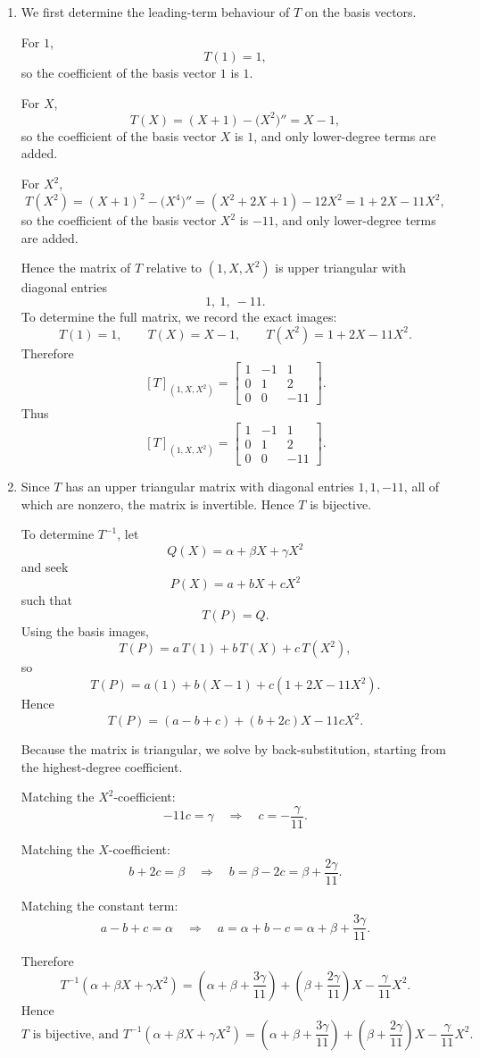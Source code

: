 \documentclass[12pt]{article}
\begin{document}
\begin{enumerate}[label=(\alph*)]
\item We first determine the leading-term behaviour of \(T\) on the basis vectors.

For \(1\),
\[
T(1)=1,
\]
so the coefficient of the basis vector \(1\) is \(1\).

For \(X\),
\[
T(X)=(X+1)-\bigl(X^2\bigr)''=X-1,
\]
so the coefficient of the basis vector \(X\) is \(1\), and only lower-degree terms are added.

For \(X^2\),
\[
T(X^2)=(X+1)^2-\bigl(X^4\bigr)''
=(X^2+2X+1)-12X^2
=1+2X-11X^2,
\]
so the coefficient of the basis vector \(X^2\) is \(-11\), and only lower-degree terms are added.

Hence the matrix of \(T\) relative to \((1,X,X^2)\) is upper triangular with diagonal entries
\[
1,\ 1,\ -11.
\]
To determine the full matrix, we record the exact images:
\[
T(1)=1,\qquad
T(X)=X-1,\qquad
T(X^2)=1+2X-11X^2.
\]
Therefore
\[
[T]_{(1,X,X^2)}
=
\begin{bmatrix}
1 & -1 & 1\\
0 & 1 & 2\\
0 & 0 & -11
\end{bmatrix}.
\]
Thus
\[
\boxed{
[T]_{(1,X,X^2)}
=
\begin{bmatrix}
1 & -1 & 1\\
0 & 1 & 2\\
0 & 0 & -11
\end{bmatrix}.}
\]
\newpage
\item Since \(T\) has an upper triangular matrix with diagonal entries \(1,1,-11\), all of which are nonzero, the matrix is invertible. Hence \(T\) is bijective.

To determine \(T^{-1}\), let
\[
Q(X)=\alpha+\beta X+\gamma X^2
\]
and seek
\[
P(X)=a+bX+cX^2
\]
such that
\[
T(P)=Q.
\]
Using the basis images,
\[
T(P)=a\,T(1)+b\,T(X)+c\,T(X^2),
\]
so
\[
T(P)=a(1)+b(X-1)+c(1+2X-11X^2).
\]
Hence
\[
T(P)=(a-b+c)+(b+2c)X-11cX^2.
\]

Because the matrix is triangular, we solve by back-substitution, starting from the highest-degree coefficient.

Matching the \(X^2\)-coefficient:
\[
-11c=\gamma
\quad\Longrightarrow\quad
c=-\frac{\gamma}{11}.
\]

Matching the \(X\)-coefficient:
\[
b+2c=\beta
\quad\Longrightarrow\quad
b=\beta-2c=\beta+\frac{2\gamma}{11}.
\]

Matching the constant term:
\[
a-b+c=\alpha
\quad\Longrightarrow\quad
a=\alpha+b-c=\alpha+\beta+\frac{3\gamma}{11}.
\]

Therefore
\[
T^{-1}(\alpha+\beta X+\gamma X^2)
=
\left(\alpha+\beta+\frac{3\gamma}{11}\right)
+
\left(\beta+\frac{2\gamma}{11}\right)X
-
\frac{\gamma}{11}X^2.
\]
Hence
\[
\boxed{
T \text{ is bijective, and }
T^{-1}(\alpha+\beta X+\gamma X^2)
=
\left(\alpha+\beta+\frac{3\gamma}{11}\right)
+
\left(\beta+\frac{2\gamma}{11}\right)X
-
\frac{\gamma}{11}X^2.}
\]
\end{enumerate}
\end{document}
